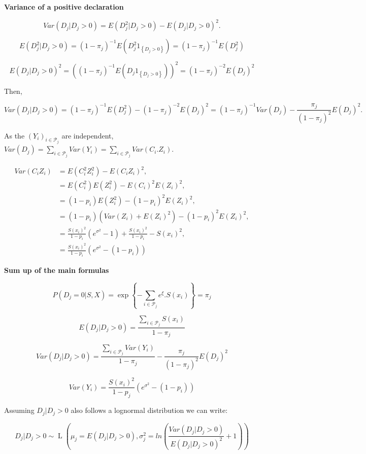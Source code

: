 \documentclass[
  english,
  man,floatsintext]{apa6}
\begin{document}
\textbf{Variance of a positive declaration}

\[Var(D_j \vert D_j >0)  = E(D_j^2 \vert D_j >0)- E(D_j \vert D_j >0)^2.\]

\[E(D_j^2 \vert D_j >0) = (1-\pi_j)^{-1} E(D_j^2 1_{\left \lbrace D_j >0\right\rbrace}) = (1-\pi_j)^{-1} E(D_j^2 )\]

\[E(D_j \vert D_j >0)^2 = ((1-\pi_j)^{-1} E(D_j 1_{\left \lbrace D_j >0\right\rbrace}))^2 =  (1-\pi_j)^{-2} E(D_j)^2\]

Then,

\[Var(D_j \vert D_j >0) = (1-\pi_j)^{-1} E(D_j^2 ) - (1-\pi_j)^{-2} E(D_j)^2 = (1-\pi_j)^{-1} Var(D_j) - \frac{\pi_j}{(1-\pi_j)^2} E(D_j)^2.\]

As the \((Y_{i})_{i\in \mathcal{P}_j}\) are independent, \(Var(D_j) =\sum_{i \in\mathcal{P}_j} Var(Y_{i}) = \sum_{i \in\mathcal{P}_j} Var(C_{i}.Z_{i})\).

\begin{align*}
Var(C_{i} Z_{i}) & = E( C_{i}^2 Z_{i}^2 ) - E(C_{i} Z_{i})^2,\\
& =  E( C_{i}^2) E(Z_{i}^2 ) -E(C_{i})^2 E(Z_{i})^2,\\
& = (1-p_{i}) E(Z_{i}^2 ) - (1-p_{i})^2 E(Z_{i})^2,\\
& = (1-p_{i})(Var(Z_{i})+E(Z_{i})^2)-(1-p_{i})^2E(Z_{i})^2,\\
& = \frac{S(x_{i})^2}{1-p_{i}}(e^{\sigma^2}-1)+\frac{S(x_{i})^2}{1-p_{i}}-S(x_{i})^2,\\
& = \frac{S(x_{i})^2}{1-p_{i}}(e^{\sigma^2}-(1-p_{i}))
\end{align*}

\textbf{Sum up of the main formulas}

\[P(D_j = 0 \vert S, X) = \exp{ \left \lbrace- \sum_{i\in \mathcal{P}_j} e^{\xi}. S(x_{i})\right \rbrace} = \pi_j\]

\[E(D_j \vert D_j > 0)=\frac{\sum_{i \in \mathcal{P}_j} S(x_{i})}{1-\pi_j}\]

\[Var(D_j \vert D_j > 0) = \frac{\sum_{i \in \mathcal{P}_j} Var(Y_{i})}{1-\pi_j} - \frac{\pi_j}{(1-\pi_j)^2}E(D_j)^2\]

\[Var(Y_{i})=\frac{S(x_{i})^2}{1-p_{j}}(e^{\sigma^2}-(1-p_{i}))\]

Assuming \(D_j \vert D_j > 0\) also follows a lognormal distribution we can write:

\[D_j \vert D_j > 0 \sim \operatorname{L}( \mu_j = E(D_j \vert D_j > 0), \sigma_j^2= ln(\frac{Var(D_j \vert D_j > 0)}{E(D_j \vert D_j > 0)^2} + 1))\]
\end{document}
